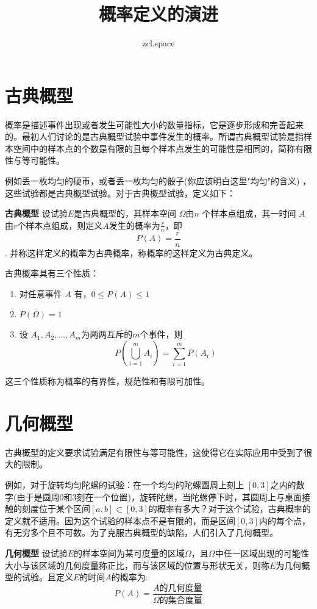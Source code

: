 \documentclass[10pt,a4paper,UTF8]{article}
\author{zcl.space}
\date{}
\title{概率定义的演进}
\begin{document}
\maketitle
\tableofcontents

\newpage



\section{古典概型}
\label{sec:orgheadline1}


概率是描述事件出现或者发生可能性大小的数量指标，它是逐步形成和完善起来的。最初人们讨论的是古典概型试验中事件发生的概率。所谓古典概型试验是指样本空间中的样本点的个数是有限的且每个样本点发生的可能性是相同的，简称有限性与等可能性。

例如丢一枚均匀的硬币，或者丢一枚均匀的骰子(你应该明白这里"均匀"的含义) ，这些试验都是古典概型试验。对于古典概型试验，定义如下：

\begin{DEFINITION}
\textbf{古典概型}  设试验\(E\)是古典概型的，其样本空间 \(\Omega\)由\(n\) 个样本点组成，其一时间 \(A\) 由\(r\)个样本点组成，则定义\(A\)发生的概率为\(\frac{r}{n}\)，即\[P(A) = \frac{r}{n}\]. 并称这样定义的概率为古典概率，称概率的这样定义为古典定义。
\end{DEFINITION}

古典概率具有三个性质：
\begin{enumerate}
\item 对任意事件 \(A\) 有，\(0 \leq P(A) \leq 1\)
\item \(P(\Omega) = 1\)
\item 设 \(A_{1},A_{2},\ldots,A_{m}\)为两两互斥的\(m\)个事件，则\[P(\bigcup_{i=1}^{m}A_{i}) = \sum_{i=1}^{m}P(A_{i})\]
\end{enumerate}

这三个性质称为概率的有界性，规范性和有限可加性。

\section{几何概型}
\label{sec:orgheadline2}


古典概型的定义要求试验满足有限性与等可能性，这使得它在实际应用中受到了很大的限制。

例如，对于旋转均匀陀螺的试验：在一个均匀的陀螺圆周上刻上 \([0,3]\)之内的数字(由于是圆周0和3刻在一个位置)，旋转陀螺，当陀螺停下时，其圆周上与桌面接触的刻度位于某个区间\([a,b]\subset [0,3]\)的概率有多大？对于这个试验，古典概率的定义就不适用。因为这个试验的样本点不是有限的，而是区间\([0,3]\)内的每个点，有无穷多个且不可数。为了克服古典概型的缺陷，人们引入了几何概型。

\begin{DEFINITION}
\textbf{几何概型} 设试验\(E\)的样本空间为某可度量的区域\(\Omega\)，且\(\Omega\)中任一区域出现的可能性大小与该区域的几何度量称正比，而与该区域的位置与形状无关，则称\(E\)为几何概型的试验。且定义\(E\)的时间\(A\)的概率为:\[P(A)=\frac{A的几何度量}{\Omega 的集合度量}\]
\end{DEFINITION}
\end{document}
